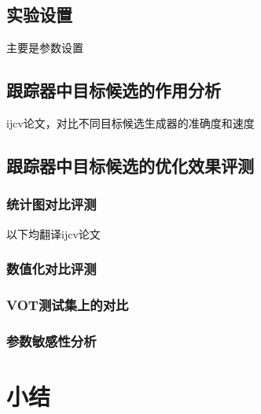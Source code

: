 \subsection{实验设置}
主要是参数设置

\subsection{跟踪器中目标候选的作用分析}
ijcv论文，对比不同目标候选生成器的准确度和速度

\subsection{跟踪器中目标候选的优化效果评测}
\subsubsection{统计图对比评测}
以下均翻译ijcv论文
\subsubsection{数值化对比评测}
\subsubsection{VOT测试集上的对比}
\subsubsection{参数敏感性分析}

\section{小结}